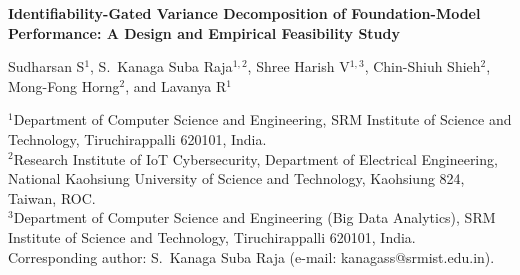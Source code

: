 \documentclass[11pt]{article}
\theoremstyle{definition}
\theoremstyle{plain}
\begin{document}
\begin{center}
{\Large\bfseries Identifiability-Gated Variance Decomposition of Foundation-Model Performance: A Design and Empirical Feasibility Study}
\end{center}

\begin{center}
Sudharsan S$^{1}$, S.~Kanaga Suba Raja$^{1,2}$, Shree Harish V$^{1,3}$, Chin-Shiuh Shieh$^{2}$, Mong-Fong Horng$^{2}$, and Lavanya R$^{1}$
\end{center}

\vspace{0.3em}
\footnotesize
\noindent$^{1}$Department of Computer Science and Engineering, SRM Institute of Science and Technology, Tiruchirappalli 620101, India.\\
$^{2}$Research Institute of IoT Cybersecurity, Department of Electrical Engineering, National Kaohsiung University of Science and Technology, Kaohsiung 824, Taiwan, ROC.\\
$^{3}$Department of Computer Science and Engineering (Big Data Analytics), SRM Institute of Science and Technology, Tiruchirappalli 620101, India.\\
\vspace{0.3em}
Corresponding author: S.~Kanaga Suba Raja (e-mail: kanagass@srmist.edu.in).
\normalsize

\vspace{1em}
\end{document}
